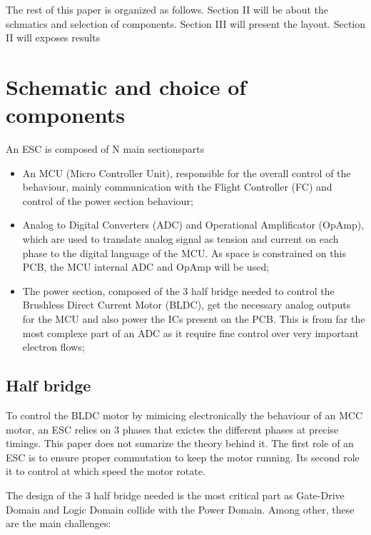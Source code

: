 \documentclass[a4paper, 10pt, conference]{IEEEtran} %
\begin{document}
The rest of this paper is organized as follows. Section II will be about the schmatics and selection of components. Section III will present the layout. Section II will exposes results


\section{Schematic and choice of components}

An ESC is composed of N main sectionsparts
\begin{itemize}
    \item An MCU (Micro Controller Unit), responsible for the overall control of the behaviour, mainly communication with the Flight Controller (FC) and control of the power section behaviour;
    \item Analog to Digital Converters (ADC) and Operational Amplificator (OpAmp), which are used to translate analog signal as tension and current on each phase to the digital language of the MCU. As space is constrained on this PCB, the MCU internal ADC and OpAmp will be used;
    \item The power section, composed of the 3 half bridge needed to control the Brushless Direct Current Motor (BLDC), get the necessary analog outputs for the MCU and also power the ICs present on the PCB. This is from far the most complexe part of an ADC as it require fine control over very important electron flows;
\end{itemize}

\subsection{Half bridge}

To control the BLDC motor by mimicing electronically the behaviour of an MCC motor, an ESC relies on 3 phases that exictes the different phases at precise timings. This paper does not sumarize the theory behind it. The first role of an ESC is to ensure proper commutation to keep the motor running. Its second role it to control at which speed the motor rotate. 

The design of the 3 half bridge needed is the most critical part as Gate-Drive Domain and Logic Domain collide with the Power Domain. Among other, these are the main challenges:
\end{document}
